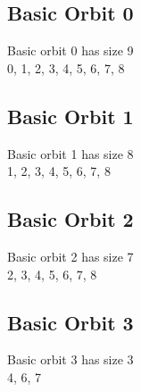 \subsection*{Basic Orbit 0}



Basic orbit 0 has size 9\\
0, 1, 2, 3, 4, 5, 6, 7, 8\\
\bigskip

\subsection*{Basic Orbit 1}



Basic orbit 1 has size 8\\
1, 2, 3, 4, 5, 6, 7, 8\\
\bigskip

\subsection*{Basic Orbit 2}



Basic orbit 2 has size 7\\
2, 3, 4, 5, 6, 7, 8\\
\bigskip

\subsection*{Basic Orbit 3}



Basic orbit 3 has size 3\\
4, 6, 7\\
\bigskip
